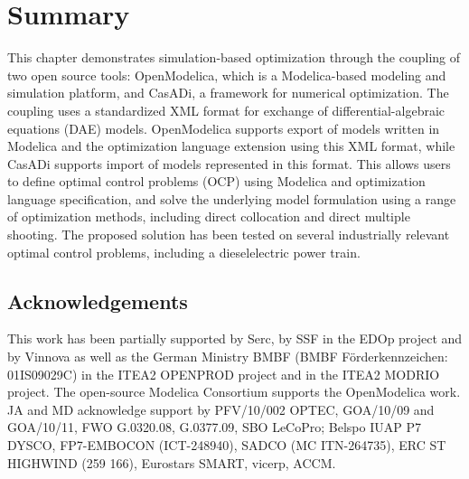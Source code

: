 \section{Summary}
\label{sec:optimizationsummary}

This chapter demonstrates simulation-based  optimization through the coupling of two open source tools: OpenModelica, which is a Modelica-based modeling and simulation platform, and CasADi, a framework for numerical optimization. The coupling uses a standardized XML format for exchange of
differential-algebraic equations (DAE) models. OpenModelica supports export of models written in Modelica and the optimization language extension using this XML format, while CasADi supports import of models represented in this format. This allows users to define optimal control problems (OCP) using
Modelica and optimization language specification, and solve the underlying model formulation using a range of optimization methods, including direct collocation and direct multiple shooting. The proposed solution has been tested on several industrially relevant optimal control problems, including a dieselelectric power train.

\subsection*{Acknowledgements}
\label{sec:optimizationacknowledgements}

This work has been partially supported by Serc, by SSF in the EDOp project and by Vinnova as well as the German
Ministry BMBF (BMBF F\"{o}rderkennzeichen: 01IS09029C) in the ITEA2 OPENPROD project and in the ITEA2 MODRIO
project. The open-source Modelica Consortium supports the OpenModelica work.
JA and MD acknowledge support by PFV/10/002 OPTEC, GOA/10/09 and GOA/10/11, FWO G.0320.08, G.0377.09,
SBO LeCoPro; Belspo IUAP P7 DYSCO, FP7-EMBOCON (ICT-248940), SADCO (MC ITN-264735),
ERC ST HIGHWIND (259 166), Eurostars SMART, vicerp, ACCM.





